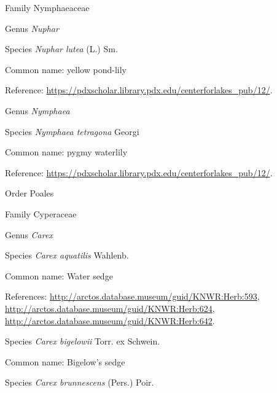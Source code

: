 \documentclass[9pt, article]{memoir}
\begin{document}
\begin{multicols}{2}
\vspace{6pt}\noindent\hspace{24pt}Family Nymphaeaceae


\vspace{6pt}\noindent\hspace{30pt}Genus \textit{Nuphar}


\vspace{6pt}\noindent\hspace{36pt}Species \textit{Nuphar lutea} (L.) Sm.


Common name: yellow pond-lily

Reference: 
\url{https://pdxscholar.library.pdx.edu/centerforlakes_pub/12/}.

\vspace{6pt}\noindent\hspace{30pt}Genus \textit{Nymphaea}


\vspace{6pt}\noindent\hspace{36pt}Species \textit{Nymphaea tetragona} Georgi


Common name: pygmy waterlily

Reference: 
\url{https://pdxscholar.library.pdx.edu/centerforlakes_pub/12/}.

\vspace{6pt}\noindent\hspace{18pt}Order Poales


\vspace{6pt}\noindent\hspace{24pt}Family Cyperaceae


\vspace{6pt}\noindent\hspace{30pt}Genus \textit{Carex}


\vspace{6pt}\noindent\hspace{36pt}Species \textit{Carex aquatilis} Wahlenb.


Common name: Water sedge

References: 
\url{http://arctos.database.museum/guid/KNWR:Herb:593}, 
\url{http://arctos.database.museum/guid/KNWR:Herb:624}, 
\url{http://arctos.database.museum/guid/KNWR:Herb:642}.

\vspace{6pt}\noindent\hspace{36pt}Species \textit{Carex bigelowii} Torr. ex Schwein.


Common name: Bigelow's sedge

\vspace{6pt}\noindent\hspace{36pt}Species \textit{Carex brunnescens} (Pers.) Poir.



\end{multicols}
\end{document}
